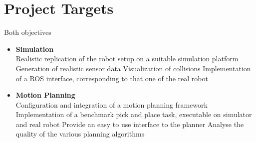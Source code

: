 \section{Project Targets}
Both objectives

	\begin{itemize}
	
		\item \textbf{Simulation}\\
			Realistic replication of the robot setup on a suitable simulation platform
			Generation of realistic sensor data
			Visualization of collisions
			Implementation of a ROS interface, corresponding to that one of the real robot
		\item \textbf{Motion Planning}\\
			Configuration and integration of a motion planning framework
			Implementation of a benchmark pick and place task, executable on simulator and
			real robot
			Provide an easy to use interface to the planner
			Analyse the quality of the various planning algorithms
			
	\end{itemize}